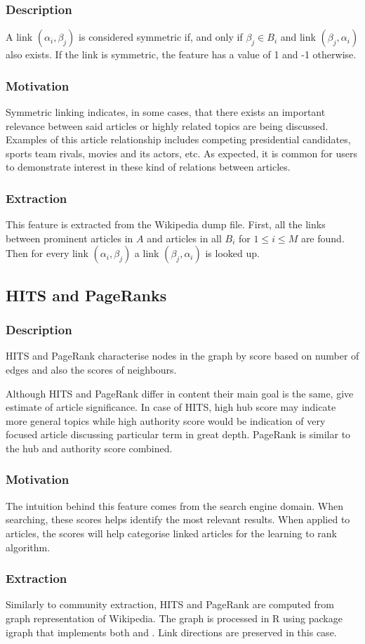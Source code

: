 \subsubsection{Description}
A link $(\alpha_i, \beta_j)$ is considered symmetric if, and only if $\beta_j \in B_i$ and link $(\beta_j, \alpha_i)$ also exists. If the link is symmetric, the feature has a value of 1 and -1 otherwise.

\subsubsection{Motivation}
Symmetric linking indicates, in some cases, that there exists an important relevance between said articles or highly related topics are being discussed. Examples of this article relationship includes competing presidential candidates, sports team rivals, movies and its actors, etc. As expected, it is common for users to demonstrate interest in these kind of relations between articles.

\subsubsection{Extraction}
This feature is extracted from the Wikipedia dump file. First, all the links between prominent articles in $A$ and articles in all $B_i$ for $1 \le i \le M$ are found. Then for every link $(\alpha_i, \beta_j)$ a link $(\beta_j, \alpha_i)$ is looked up.

\subsection{HITS and PageRanks}
\subsubsection{Description}
HITS and PageRank characterise nodes in the graph by score based on number of edges and also the scores of neighbours.

Although HITS and PageRank differ in content their main goal is the same, give estimate of article significance. In case of HITS, high hub score may indicate more general topics while high authority score would be indication of very focused article discussing particular term in great depth. PageRank is similar to the hub and authority score combined.

\subsubsection{Motivation}
The intuition behind this feature comes from the search engine domain. When searching, these scores helps identify the most relevant results. When applied to articles, the scores will help categorise linked articles for the learning to rank algorithm.

\subsubsection{Extraction}
Similarly to community extraction, HITS and PageRank are computed from graph representation of Wikipedia. The graph is processed in R using package igraph that implements both \cite{pagerank} and \cite{hits}. Link directions are preserved in this case.